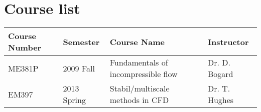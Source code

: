\section{Course list}

\begin{table}[h]
\centering
\doublespacing
\begin{tabular}{llll}
\hline \hline
Course Number & Semester & Course Name & Instructor \\ 
\hline 
ME381P  & 2009 Fall   & Fundamentals of incompressible flow                & Dr. D. Bogard \\
EM397   & 2013 Spring & Stabil/multiscale methods in CFD                   & Dr. T. Hughes \\ 
\hline \hline
\end{tabular} 
\end{table}
